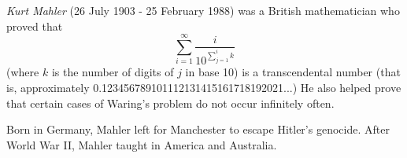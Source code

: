 \documentclass[12pt]{article}
\begin{document}
{\em Kurt Mahler} (26 July 1903 - 25 February 1988) was a British mathematician who proved that $$\sum_{i = 1}^\infty \frac{i}{10^{\sum_{j = 1}^i k}}$$ (where $k$ is the number of digits of $j$ in base 10) is a transcendental number (that is, approximately 0.123456789101112131415161718192021...) He also helped prove that certain cases of Waring's problem do not occur infinitely often.

Born in Germany, Mahler left for Manchester to escape Hitler's genocide. After World War II, Mahler taught in America and Australia.
\end{document}
